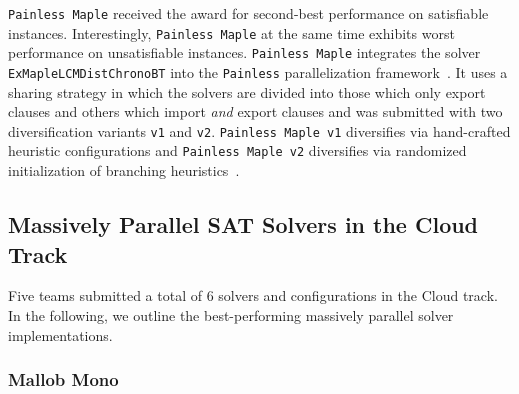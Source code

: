 \documentclass{elsarticle}
\newcommand{\solver}[1]{\texttt{#1}}
\begin{document}
\solver{Painless Maple} received the award for second-best performance on satisfiable instances. 
Interestingly, \solver{Painless Maple}  
at the same time exhibits worst performance on unsatisfiable instances. 
\solver{Painless Maple} integrates the solver \solver{ExMapleLCMDistChronoBT} into the \solver{Painless} parallelization framework~\cite{Frioux:2017:Painless}. 
It uses a sharing strategy in which the solvers are divided into those which only export clauses and others which import \emph{and} export clauses and was submitted with two diversification variants \solver{v1} and \solver{v2}. 
\solver{Painless Maple v1} diversifies via hand-crafted heuristic configurations and \solver{Painless Maple v2} diversifies via randomized initialization of branching heuristics~\cite{SC2020}. 


\subsection{Massively Parallel SAT Solvers in the Cloud Track}
\label{sec:part:cloud}

Five teams submitted a total of $6$ solvers and configurations in the Cloud track. 
In the following, we outline the best-performing massively parallel solver implementations. 



\subsubsection{Mallob Mono}
\end{document}
